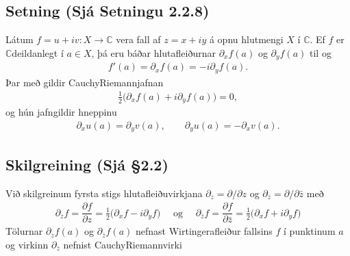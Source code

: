 \documentclass[a4paper,10pt,icelandic]{sphinxmanual}
\begin{document}
\subsection{Setning (Sjá Setningu 2.2.8)}
\label{\detokenize{Kafli02:setning-sja-setningu-2-2-8}}
Látum \(f=u+iv:X\to {\mathbb{C}}\) vera fall af \(z=x+iy\) á opnu hlutmengi \(X\) í \({\mathbb{C}}\). Ef \(f\) er \({\mathbb{C}}\)\textendash{}deildanlegt í \(a\in X\), þá eru báðar hlutafleiðurnar \(\partial_xf(a)\) og \(\partial_yf(a)\) til og
\begin{equation*}
\begin{split}f'(a)=\partial_xf(a)=-i\partial_yf(a).\end{split}
\end{equation*}
Þar með gildir Cauchy\textendash{}Riemann\textendash{}jafnan
\begin{equation*}
\begin{split}\tfrac 12\big(\partial_xf(a)+i\partial_yf(a)\big)=0,\end{split}
\end{equation*}
og hún jafngildir hneppinu
\begin{equation*}
\begin{split}\partial_xu(a)=\partial_yv(a), \qquad \partial_yu(a)=-\partial_xv(a).\end{split}
\end{equation*}

\subsection{Skilgreining (Sjá \S{}2.2)}
\label{\detokenize{Kafli02:skilgreining-sja-2-2}}
Við skilgreinum fyrsta stigs hlutafleiðuvirkjana \({\partial}_z={\partial}/{\partial}z\) og \({\partial}_{\bar z}={\partial}/{\partial}\bar z\) með
\begin{equation*}
\begin{split}{\partial}_zf=\dfrac{{\partial}f}{{\partial} z}
=\tfrac 12\big({\partial}_xf-i{\partial}_yf\big) \quad \text{ og } \quad
{\partial}_{\bar z}f=\dfrac{{\partial}f}{{\partial}\bar z}
=\tfrac 12\big({\partial}_xf+i{\partial}_yf\big)
\label{4.2.14}\end{split}
\end{equation*}
Tölurnar \({\partial}_zf(a)\) og \({\partial}_{\bar z}f(a)\)
nefnast Wirtinger\textendash{}afleiður fallsins \(f\) í punktinum \(a\) og
virkinn \({\partial}_{\bar z}\) nefnist Cauchy\textendash{}Riemann\textendash{}virki
\end{document}
